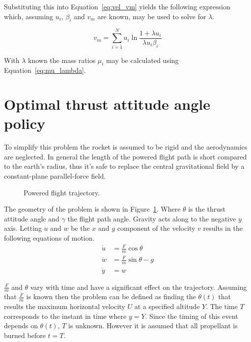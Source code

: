 Substituting this into Equation~\eqref{eq:vel_vm} yields the following expression which, assuming $u_i$, $\beta_i$ and $v_m$ are known, may be used to solve for $\lambda$.

\begin{equation}
    v_m = \sum_{i=1}^N u_i \ln{\frac{1+\lambda u_i}{\lambda u_i \beta_i}}
\end{equation}

With $\lambda$ known the mass ratios $\mu_i$ may be calculated using Equation~\eqref{eq:mu_lambda}.


\section{Optimal thrust attitude angle policy}
To simplify this problem the rocket is assumed to be rigid and the aerodynamics are neglected. In general the length of the powered flight path is short compared to the earth's radius, thus it's safe to replace the central gravitational field by a constant-plane parallel-force field.

\begin{figure}[ht]			
	\centering
				
	\caption{Powered flight trajectory\cite{thomson2012introduction}.}
	\label{fig:pow_fly_trj_an}
\end{figure}
The geometry of the problem is shown in Figure~\ref{fig:pow_fly_trj_an}. Where $\theta$ is the thrust attitude angle and $\gamma$ the flight path angle. Gravity acts along to the negative $y$ axis. Letting $u$ and $w$ be the $x$ and $y$ component of the velocity $v$ results in the following equations of motion.
\begin{align}
    \dot{u} &= \frac{F}{m}\cos{\theta} \label{eq:eom_udot} \\
    \dot{w} &= \frac{F}{m}\sin{\theta} - g \label{eq:eom_wdot}\\
    \dot{y} &= w \label{eq:eom_ydot}
\end{align}

$\frac{F}{m}$ and $\theta$ vary with time and have a significant effect on the trajectory. Assuming that $\frac{F}{m}$ is known then the problem can be defined as finding the $\theta\left(t\right)$ that results the maximum horizontal velocity $U$ at a specified altitude $Y$. The time $T$ corresponds to the instant in time where $y=Y$. Since the timing of this event depends on $\theta\left(t\right)$, $T$ is unknown. However it is assumed that all propellant is burned before $t=T$.

